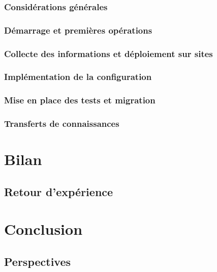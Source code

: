 \documentclass[french, a4paper]{beamer}
\begin{document}
\subsubsection{Considérations générales}
\subsubsection{Démarrage et premières opérations}
\subsubsection{Collecte des informations et déploiement sur sites}
\subsubsection{Implémentation de la configuration}
\subsubsection{Mise en place des tests et migration}
\subsubsection{Transferts de connaissances}


\section{Bilan}
\subsection{Retour d'expérience}


\section{Conclusion}
\subsection{Perspectives}
\end{document}
